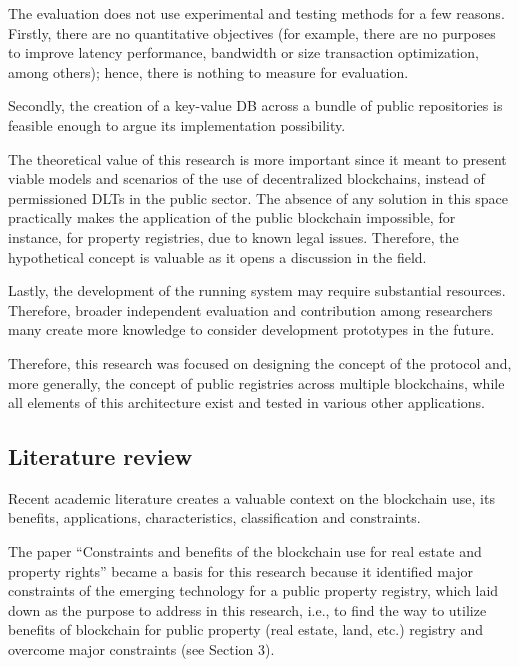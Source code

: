 \begin{multicols}{2}
The evaluation does not use experimental and testing methods for a few reasons. Firstly, there are no quantitative objectives (for example, there are no purposes to improve latency performance, bandwidth or size transaction optimization, among others); hence, there is nothing to measure for evaluation.

Secondly, the creation of a key-value DB across a bundle of public repositories is feasible enough to argue its implementation possibility.

The theoretical value of this research is more important since it meant to present viable models and scenarios of the use of decentralized blockchains, instead of permissioned DLTs in the public sector. The absence of any solution in this space practically makes the application of the public blockchain impossible, for instance, for property registries, due to known legal issues. Therefore, the hypothetical concept is valuable as it opens a discussion in the field.

Lastly, the development of the running system may require substantial resources. Therefore, broader independent evaluation and contribution among researchers many create more knowledge to consider development prototypes in the future.

Therefore, this research was focused on designing the concept of the protocol and, more generally, the concept of public registries across multiple blockchains, while all elements of this architecture exist and tested in various other applications.

\subsection{Literature review}

Recent academic literature creates a valuable context on the blockchain use, its benefits, applications, characteristics, classification and constraints.

The paper “Constraints and benefits of the blockchain use for real estate and property rights” \cite{art1-key04} became a basis for this research because it identified major constraints of the emerging technology for a public property registry, which laid down as the purpose to address in this research, i.e., to find the way to utilize benefits of blockchain for public property (real estate, land, etc.) registry and overcome major constraints (see Section 3).


\end{multicols}
